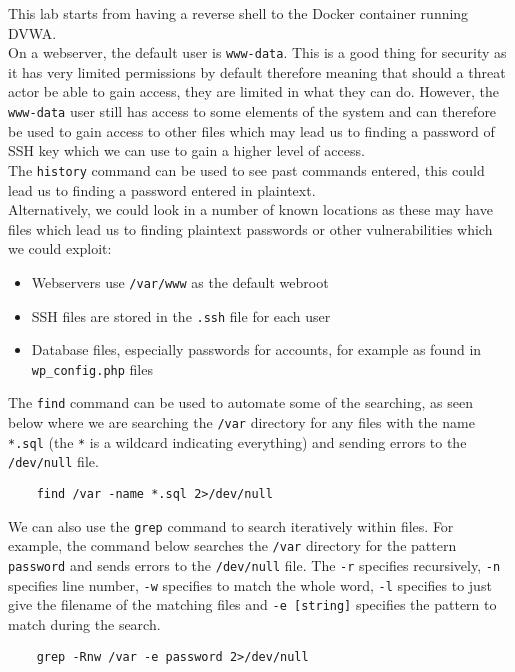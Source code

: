 
This lab starts from having a reverse shell to the Docker container running DVWA.\\

On a webserver, the default user is \verb|www-data|. This is a good thing for security as it has very limited permissions by default therefore meaning that should a threat actor be able to gain access, they are limited in what they can do. However, the \verb|www-data| user still has access to some elements of the system and can therefore be used to gain access to other files which may lead us to finding a password of SSH key which we can use to gain a higher level of access.\\

The \verb|history| command can be used to see past commands entered, this could lead us to finding a password entered in plaintext.\\

Alternatively, we could look in a number of known locations as these may have files which lead us to finding plaintext passwords or other vulnerabilities which we could exploit:
\begin{itemize}
    \item Webservers use \verb|/var/www| as the default webroot
    \item SSH files are stored in the \verb|.ssh| file for each user
    \item Database files, especially passwords for accounts, for example as found in \verb|wp_config.php| files
\end{itemize}

The \verb|find| command can be used to automate some of the searching, as seen below where we are searching the \verb|/var| directory for any files with the name \verb|*.sql| (the \verb|*| is a wildcard indicating everything) and sending errors to the \verb|/dev/null| file.
\begin{verbatim}
    find /var -name *.sql 2>/dev/null
\end{verbatim}

We can also use the \verb|grep| command to search iteratively within files. For example, the command below searches the \verb|/var| directory for the pattern \verb|password| and sends errors to the \verb|/dev/null| file. The \verb|-r| specifies recursively, \verb|-n| specifies line number, \verb|-w| specifies to match the whole word, \verb|-l| specifies to just give the filename of the matching files and \verb|-e [string]| specifies the pattern to match during the search.
\begin{verbatim}
    grep -Rnw /var -e password 2>/dev/null
\end{verbatim}

